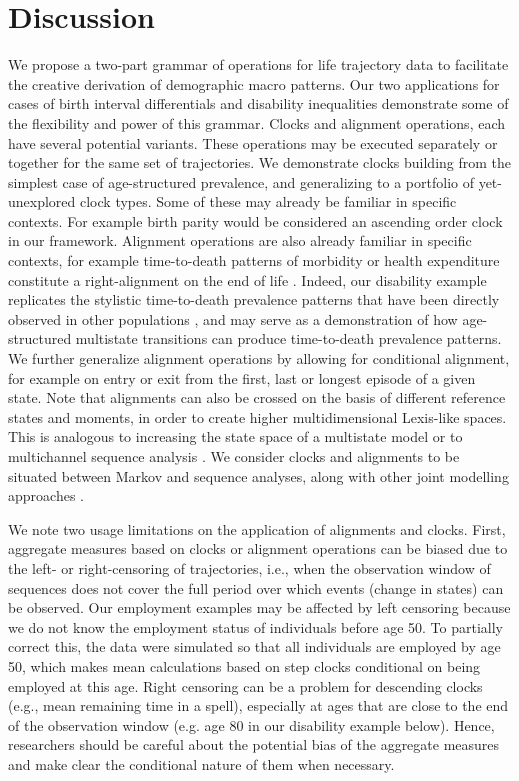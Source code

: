 \documentclass[a4paper,left=1.25cm,right=1.25cm,top=1.25cm,bottom=1.25cm]{article}
\begin{document}
\section{Discussion}

We propose a two-part grammar of operations for life trajectory data to facilitate the creative derivation of demographic macro patterns. Our two applications for cases of birth interval differentials and disability inequalities demonstrate some of the flexibility and power of this grammar. Clocks and alignment operations, each have several potential variants. These operations may be executed separately or together for the same set of trajectories. We demonstrate clocks building from the simplest case of age-structured prevalence, and generalizing to a portfolio of yet-unexplored clock types. Some of these may already be familiar in specific contexts. For example birth parity would be considered an ascending order clock in our framework. Alignment operations are also already familiar in specific contexts, for example time-to-death patterns of morbidity or health expenditure constitute a right-alignment on the end of life \citep{riffe2017unified, raab2018pathways, potente2018disability}. Indeed, our disability example replicates the stylistic time-to-death prevalence patterns that have been directly observed in other populations \citep{klijs2010disability, riffe2016time}, and may serve as a demonstration of how age-structured multistate transitions can produce time-to-death prevalence patterns. We further generalize alignment operations by allowing for conditional alignment, for example on entry or exit from the first, last or longest episode of a given state. Note that alignments can also be crossed on the basis of different reference states and moments, in order to create higher multidimensional Lexis-like spaces. This is analogous to increasing the state space of a multistate model or to multichannel sequence analysis \citep{robette2015global, gauthier2010multichannel}. We consider clocks and alignments to be situated between Markov and sequence analyses, along with other joint modelling approaches \citep{studer2018estimating}.

We note two usage limitations on the application of alignments and clocks. First, aggregate measures based on clocks or alignment operations can be biased due to the left- or right-censoring of trajectories, i.e., when the observation window of sequences does not cover the full period over which events (change in states) can be observed. Our employment examples may be affected by left censoring because we do not know the employment status of individuals before age 50. To partially correct this, the data were simulated so that all individuals are employed by age 50, which makes mean calculations based on step clocks conditional on being employed at this age. Right censoring can be a problem for descending clocks (e.g., mean remaining time in a spell), especially at ages that are close to the end of the observation window (e.g. age 80 in our disability example below). Hence, researchers should be careful about the potential bias of the aggregate measures and make clear the conditional nature of them when necessary.
\end{document}
